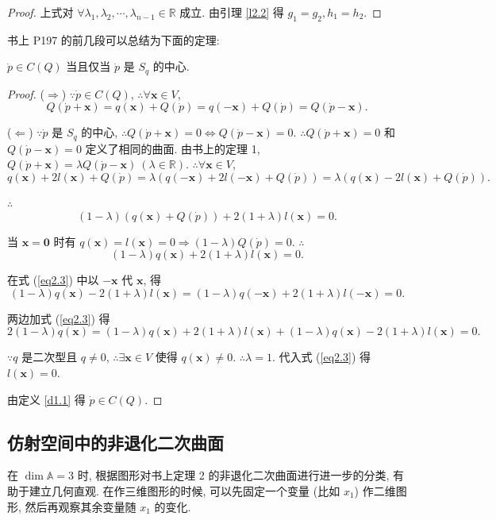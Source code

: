 \documentclass{ctexart}
\begin{document}
\begin{proof}
    上式对 $\forall\lambda_1,\lambda_2,\cdots,\lambda_{n-1}\in\mathbb{R}$ 成立. 由引理 \ref{l2.2} 得 $g_1=g_2,h_1=h_2$.
\end{proof}
书上 P197 的前几段可以总结为下面的定理:
\begin{theorem}
    $\dot{p}\in C(Q)$ 当且仅当 $\dot{p}$ 是 $S_q$ 的中心. 
\end{theorem}
\begin{proof}
    ($\Rightarrow$) $\because\dot{p}\in C(Q)$, $\therefore\forall\boldsymbol{x}\in V$,
    \[Q(\dot{p}+\boldsymbol{x})=q(\boldsymbol{x})+Q(\dot{p})=q(-\boldsymbol{x})+Q(\dot{p})=Q(\dot{p}-\boldsymbol{x}).\]

    ($\Leftarrow$) $\because\dot{p}$ 是 $S_q$ 的中心, $\therefore Q(\dot{p}+\boldsymbol{x})=0\Leftrightarrow Q(\dot{p}-\boldsymbol{x})=0$. $\therefore Q(\dot{p}+\boldsymbol{x})=0$ 和 $Q(\dot{p}-\boldsymbol{x})=0$ 定义了相同的曲面. 由书上的定理 1, $Q(\dot{p}+\boldsymbol{x})=\lambda Q(\dot{p}-\boldsymbol{x})\ (\lambda\in\mathbb{R})$. $\therefore\forall\boldsymbol{x}\in V$,
    \[q(\boldsymbol{x})+2l(\boldsymbol{x})+Q(\dot{p})=\lambda(q(\boldsymbol{-x})+2l(\boldsymbol{-x})+Q(\dot{p}))=\lambda(q(\boldsymbol{x})-2l(\boldsymbol{x})+Q(\dot{p})).\]

    $\therefore$
    \[(1-\lambda)(q(\boldsymbol{x})+Q(\dot{p}))+2(1+\lambda)l(\boldsymbol{x})=0.\]

    当 $\boldsymbol{x}=\boldsymbol{0}$ 时有 $q(\boldsymbol{x})=l(\boldsymbol{x})=0\Rightarrow(1-\lambda)Q(\dot{p})=0$. $\therefore$
    \begin{equation}\label{eq2.3}
        (1-\lambda)q(\boldsymbol{x})+2(1+\lambda)l(\boldsymbol{x})=0.
    \end{equation}

    在式 (\ref{eq2.3}) 中以 $-\boldsymbol{x}$ 代 $\boldsymbol{x}$, 得
    \[(1-\lambda)q(\boldsymbol{x})-2(1+\lambda)l(\boldsymbol{x})=(1-\lambda)q(-\boldsymbol{x})+2(1+\lambda)l(-\boldsymbol{x})=0.\]

    两边加式 (\ref{eq2.3}) 得
    \[2(1-\lambda)q(\boldsymbol{x})=(1-\lambda)q(\boldsymbol{x})+2(1+\lambda)l(\boldsymbol{x})+(1-\lambda)q(\boldsymbol{x})-2(1+\lambda)l(\boldsymbol{x})=0.\]

    $\because q$ 是二次型且 $q\neq0$, $\therefore\exists\boldsymbol{x}\in V$ 使得 $q(\boldsymbol{x})\neq0$. $\therefore\lambda=1$. 代入式 (\ref{eq2.3}) 得 $l(\boldsymbol{x})=0$.

    由定义 \ref{d1.1} 得 $\dot{p}\in C(Q)$.
\end{proof}
\subsection{仿射空间中的非退化二次曲面}
在 $\dim\mathbb{A}=3$ 时, 根据图形对书上定理 2 的非退化二次曲面进行进一步的分类, 有助于建立几何直观. 在作三维图形的时候, 可以先固定一个变量 (比如 $x_1$) 作二维图形, 然后再观察其余变量随 $x_1$ 的变化.
\end{document}
